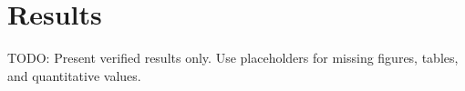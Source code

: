 \section{Results}

TODO: Present verified results only. Use placeholders for missing figures, tables, and quantitative values.
